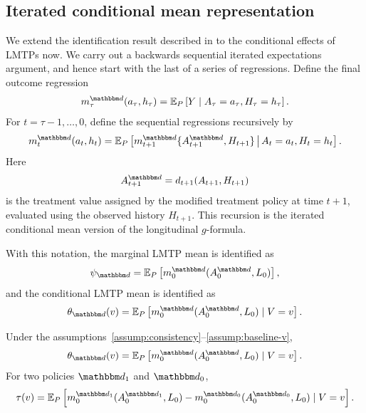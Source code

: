 \documentclass[11pt]{article}
\begin{document}
\subsection{Iterated conditional mean representation}
\label{subsec:iterated-mean-representation}

We extend the identification result described in \cite{diazNonparametricCausalEffects2023} 
to the conditional effects of LMTPs now. We carry out a backwards sequential 
iterated expectations argument, and hence start with the last of a series of 
regressions. Define the final outcome regression
\[
  m_{\tau}^{\mathbbm d}(a_\tau,h_\tau)
  =
  \mathbb{E}_{P}
  \left[
    Y
    \mid
    A_\tau=a_\tau,H_\tau=h_\tau
  \right].
\]
For \(t=\tau-1,\ldots,0\), define the sequential regressions recursively by
\[
  m_t^{\mathbbm d}(a_t,h_t)
  =
  \mathbb{E}_{P}
  \left[
    m_{t+1}^{\mathbbm d}
    \{A_{t+1}^{\mathbbm d},H_{t+1}\}
    \,\middle|\,
    A_t=a_t,H_t=h_t
  \right].
\]
Here
\[
  A_{t+1}^{\mathbbm d}
  =
  d_{t+1}(A_{t+1},H_{t+1})
\]
is the treatment value assigned by the modified treatment policy at time
\(t+1\), evaluated using the observed history \(H_{t+1}\). This recursion is the
iterated conditional mean version of the longitudinal \(g\)-formula.

With this notation, the marginal LMTP mean is identified as
\[
  \psi_{\mathbbm d}
  =
  \mathbb{E}_{P}
  \left[
    m_0^{\mathbbm d}(A_0^{\mathbbm d},L_0)
  \right],
\]
and the conditional LMTP mean is identified as
\[
  \theta_{\mathbbm d}(v)
  =
  \mathbb{E}_{P}
  \left[
    m_0^{\mathbbm d}(A_0^{\mathbbm d},L_0)
    \mid V=v
  \right].
\]

\begin{theorem}
\label{thm:iterated-mean-identification}
Under the assumptions~\ref{assump:consistency}--\ref{assump:baseline-v},
\begin{equation} \label{eqn:icm1}
  \theta_{\mathbbm d}(v)
  =
  \mathbb{E}_{P}
  \left[
    m_0^{\mathbbm d}(A_0^{\mathbbm d},L_0)
    \mid V=v
  \right].
\end{equation}
For two policies \(\mathbbm d_1\) and \(\mathbbm d_0\),
\[
  \tau(v)
  =
  \mathbb{E}_{P}
  \left[
    m_0^{\mathbbm d_1}(A_0^{\mathbbm d_1},L_0)
    -
    m_0^{\mathbbm d_0}(A_0^{\mathbbm d_0},L_0)
    \mid V=v
  \right].
\]
\end{theorem}
\end{document}

